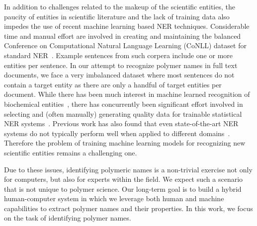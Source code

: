 In addition to challenges related to the makeup of the scientific entities, the paucity of entities in scientific literature and the lack of training data also impedes the use of recent machine learning based NER techniques.
Considerable time and manual effort are involved in creating and maintaining the balanced
Conference on Computational Natural Language Learning (CoNLL) dataset for standard NER~\cite{tjong2003introduction}.
Example sentences from such corpera include one or more entities per sentence. 
In our attempt to recognize polymer names in full text documents, we face a very imbalanced dataset where most sentences do not contain a target entity as there are only a handful of target entities per document.
While there has been much interest in machine learned recognition of biochemical entities~\cite{jessop2011oscar4,rocktaschel2012chemspot,leaman2015tmchem,swain2016chemdataextractor}, there has concurrently been significant effort involved in selecting and (often manually) generating quality data for
trainable statistical NER systems~\cite{krallinger2015chemdner}. 
Previous work has also found that even state-of-the-art NER systems do
not typically perform well when applied to different domains~\cite{krallinger2013overview}. 
Therefore the problem of training machine learning models for recognizing new scientific entities remains a challenging one.

Due to these issues, identifying polymeric names is a non-trivial exercise not only for computers, but also for experts within the field. 
We expect such a scenario that is not unique to polymer science.
Our long-term goal is to build a hybrid human-computer system in which we leverage both 
human and machine capabilities to extract polymer names and their properties. 
In this work, we focus on the task of identifying polymer names.
